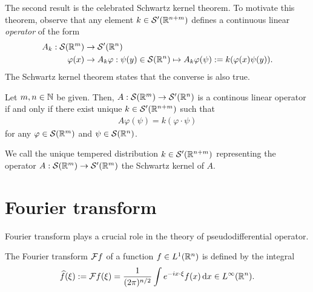 \documentclass[12pt]{article}
\begin{document}
The second result is the celebrated Schwartz kernel theorem. To motivate this theorem, observe that any element $k \in \sch'(\R^{n + m})$ defines a continuous linear \textit{operator} of the form 
\begin{align*}
A_k : \sch(\R^m) &\to \sch'(\R^n)\\
\varphi(x) &\to A_k \varphi : \psi(y) \in \sch(\R^n) \mapsto A_k \varphi (\psi) := k(\varphi(x) \psi(y)). 
\end{align*}
The Schwartz kernel theorem states that the converse is also true. 
\begin{ftheorem}
    Let $m, n \in \N$ be given. Then, $A : \sch(\R^m) \to \sch'(\R^n)$ is a continous linear operator if and only if there exist unique $k \in \sch'(\R^{n + m})$ such that 
    \begin{align*}
    A\varphi(\psi) = k(\varphi \cdot \psi)
    \end{align*}
    for any $\varphi \in \sch(\R^m)$ and $\psi \in \sch(\R^n)$. 
\end{ftheorem}

We call the unique tempered distribution $k \in \sch'(\R^{n + m})$ representing the operator $A: \sch(\R^m) \to \sch'(\R^m)$ the Schwartz kernel of $A$. 


%    


\section{Fourier transform} 
Fourier transform plays a crucial role in the theory of pseudodifferential operator.
\begin{fdefinition}
    The Fourier transform $\F f$ of a function $f \in L^1(\R^n)$ is defined by the integral
    \begin{align*}
    \widehat{f}(\xi) := \F f(\xi) = \frac{1}{(2\pi)^{n/2}} \int e^{- i x \cdot \xi} f(x)\d[x] \in L^\infty(\R^n). 
    \end{align*}
\end{fdefinition}
    
\end{document}
